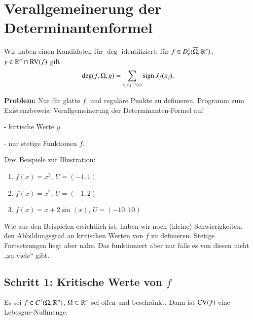 \section{Verallgemeinerung der Determinantenformel}

Wir haben einen Kandidaten für $\deg$ identifiziert; für $f\in D^1_y(\overline\Omega,\mathbb{R}^n)$, $y\in \mathbb{R}^n\cap
\mathrm{RV}(f)$ gilt
\[
    \deg(f,\Omega, g)=\sum_{x_j\in f^{-1}(y)} \mathrm{sign}\, J_f(x_j).
\]

\noindent \textbf{Problem:} Nur für glatte $f$, und reguläre Punkte zu definieren. Programm zum 
Existenzbeweis: Verallgemeinerung der Determinanten-Formel auf
\begin{description}
    \item{-} kirtische Werte $y$.
    \item{-} nur stetige Funktionen $f$.
\end{description}

\noindent Drei Beispiele zur Illustration:
\begin{enumerate}
    \item $f(x)=x^2$, $U=(-1,1)$
    \item $f(x)=x^2$, $U=(-1,2)$
    \item $f(x)=x+2\sin(x)$, $U=(-10,10)$
\end{enumerate}
Wie aus den Beispielen ersichtlich ist, haben wir noch (kleine) Schwierigkeiten, den Abbildungsgrad
an kritischen Werten von $f$ zu definieren. Stetige Fortsetzungen liegt aber nahe. Das funktioniert
aber nur falls es von diesen nicht „zu viele“ gibt.

\subsection*{Schritt 1: Kritische Werte von $f$}

\begin{lem}[Sard]\label{2.5}

Es sei $f\in C^1(\Omega, \mathbb{R}^n)$, $\Omega\subset\mathbb{R}^n$ sei offen und beschränkt. Dann ist
$\mathrm{CV}(f)$ eine Lebesgue-Nullmenge.
\end{lem}
    
